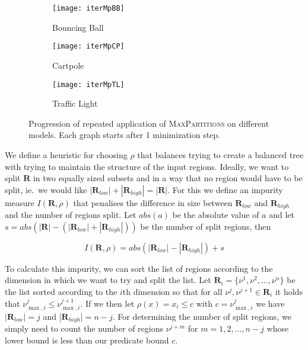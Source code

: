\begin{figure*}[ht]
    \centering
    \begin{subfigure}{0.32\textwidth}
        \texttt{[image: iterMpBB]}%
        \caption{Bouncing Ball}%
        \label{fig:iterativeMaxpartsBB}
    \end{subfigure}
    \begin{subfigure}{0.32\textwidth}
        \texttt{[image: iterMpCP]}%
        \caption{Cartpole}%
        \label{fig:iterativeMaxpartsCP}
    \end{subfigure}
    \begin{subfigure}{0.32\textwidth}
        \texttt{[image: iterMpTL]}%
        \caption{Traffic Light}%
        \label{fig:iterativeMaxpartsTL}
    \end{subfigure}
    \caption{%
        Progression of repeated application of \textsc{MaxPartitions} on
        different models. Each graph starts after 1 minimization step.
    }\label{fig:iterativeMaxparts}
\end{figure*}

We define a heuristic for choosing $\rho$ that balances trying to create a
balanced tree with trying to maintain the structure of the input regions.
Ideally, we want to split $\mathbf{R}$ in two equally sized subsets and in a way
that no region would have to be split, ie.\ we would like
$|\mathbf{R}_{low}| + |\mathbf{R}_{high}| = |\mathbf{R}|$. For this we define an
impurity measure $I(\mathbf{R},\rho)$ that penalises the
difference in size between $\mathbf{R}_{low}$ and $\mathbf{R}_{high}$ and the
number of regions split. Let $abs(a)$ be the absolute value of
$a$ and let $s = abs(|\mathbf{R}| - (|\mathbf{R}_{low}| + |\mathbf{R}_{high}|))$
be the number of split regions, then

\[
    I(\mathbf{R}, \rho)  = abs(|\mathbf{R}_{low}| -
    |\mathbf{R}_{high}|) + s
\]

To calculate this impurity, we can sort the list of regions according to the
dimension in which we want to try and split the list. Let $\mathbf{R}_i = \{
\nu^1, \nu^2, \ldots, \nu^n \}$ be the list sorted according to the $i$th
dimension so that for all $\nu^j, \nu^{j+1} \in \mathbf{R}_{i}$ it holds that
$\nu^{j}_{\max,i} \le \nu^{j+1}_{\max,i}$. If we then let $\rho(x) = x_i \le c$
with $c = \nu^{j}_{\max,i}$ we have $|\mathbf{R}_{low}| = j$ and
|$\mathbf{R}_{high}| = n - j$. For determining the number of split regions, we
simply need to count the number of regions $\nu^{j+m}$ for $m = 1, 2, \ldots,
n-j$ whose lower bound is less than our predicate bound $c$.

